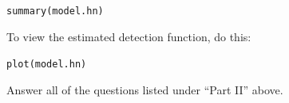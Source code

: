 \documentclass[12pt]{article}\usepackage[]{graphicx}\usepackage[]{color}
\makeatletter
\newcommand{\hlstd}[1]{\textcolor[rgb]{0,0,0}{#1}}%
\newcommand{\hlkwd}[1]{\textcolor[rgb]{0.004,0.004,0.506}{#1}}%
\newenvironment{kframe}{%
 \def\at@end@of@kframe{}%
 \ifinner\ifhmode%
  \def\at@end@of@kframe{\end{minipage}}%
  \begin{minipage}{\columnwidth}%
 \fi\fi%
 \def\FrameCommand##1{\hskip\@totalleftmargin \hskip-\fboxsep
 \colorbox{shadecolor}{##1}\hskip-\fboxsep
     \hskip-\linewidth \hskip-\@totalleftmargin \hskip\columnwidth}%
 \MakeFramed {\advance\hsize-\width
   \@totalleftmargin\z@ \linewidth\hsize
   \@setminipage}}%
 {\par\unskip\endMakeFramed%
 \at@end@of@kframe}
\newenvironment{knitrout}{}{} %
\makeatother
\begin{document}
\begin{knitrout}
\color{fgcolor}\begin{kframe}
\begin{alltt}
\hlkwd{summary}\hlstd{(model.hn)}
\end{alltt}
\end{kframe}
\end{knitrout}

To view the estimated detection function, do this:

\begin{knitrout}
\color{fgcolor}\begin{kframe}
\begin{alltt}
\hlkwd{plot}\hlstd{(model.hn)}
\end{alltt}
\end{kframe}
\end{knitrout}


Answer all of the questions listed under ``Part II'' above.
\end{document}

